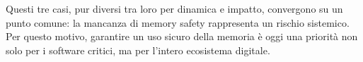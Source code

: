 Questi tre casi, pur diversi tra loro per dinamica e impatto, convergono su un punto
comune: la mancanza di memory safety rappresenta un rischio sistemico. Per questo
motivo, garantire un uso sicuro della memoria è oggi una priorità non solo per i
software critici, ma per l'intero ecosistema digitale.